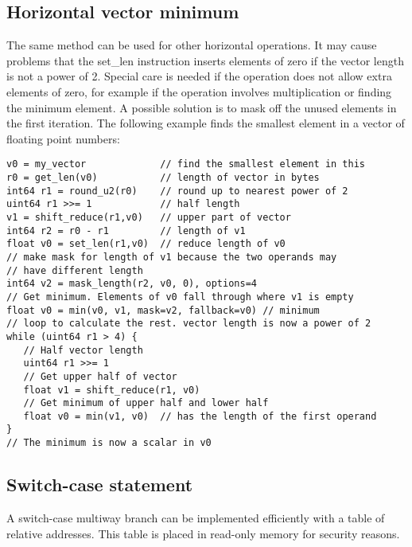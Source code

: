 \documentclass[forwardcom.tex]{subfiles}
\begin{document}
\subsection{Horizontal vector minimum} \label{horizontalVectorMin}
The same method can be used for other horizontal operations. It may cause problems that the set\_len instruction inserts elements of zero if the vector length is not a power of 2. Special care is needed if the operation does not allow extra elements of zero, for example if the operation involves multiplication or finding the minimum element. A possible solution is to mask off the unused elements in the first iteration. The following example finds the smallest element in a vector of floating point numbers:

\begin{example}
\label{exampleHorizontalMin}
\end{example}
\begin{lstlisting}[frame=single]
v0 = my_vector             // find the smallest element in this
r0 = get_len(v0)           // length of vector in bytes
int64 r1 = round_u2(r0)    // round up to nearest power of 2
uint64 r1 >>= 1            // half length
v1 = shift_reduce(r1,v0)   // upper part of vector
int64 r2 = r0 - r1         // length of v1
float v0 = set_len(r1,v0)  // reduce length of v0
// make mask for length of v1 because the two operands may 
// have different length
int64 v2 = mask_length(r2, v0, 0), options=4
// Get minimum. Elements of v0 fall through where v1 is empty
float v0 = min(v0, v1, mask=v2, fallback=v0) // minimum
// loop to calculate the rest. vector length is now a power of 2
while (uint64 r1 > 4) {
   // Half vector length
   uint64 r1 >>= 1
   // Get upper half of vector
   float v1 = shift_reduce(r1, v0)
   // Get minimum of upper half and lower half
   float v0 = min(v1, v0)  // has the length of the first operand
}
// The minimum is now a scalar in v0
\end{lstlisting}
\vspace{4mm}


\subsection{Switch-case statement} \label{switchCase}
A switch-case multiway branch can be implemented efficiently with a table of relative addresses.
This table is placed in read-only memory for security reasons.
\vspace{2mm}
\end{document}
